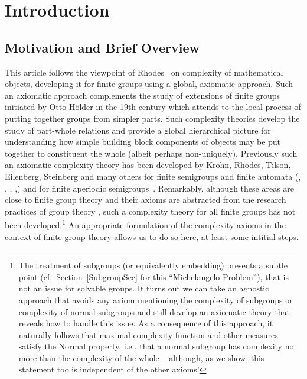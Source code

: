 \documentclass[a4paper,11pt]{amsart}
\theoremstyle{definition}
\newcommand{\1}{{\mathbf 1}}
\begin{document}
  
\newpage

\tableofcontents
\newpage
  

\section{Introduction}\label{sec_intro}

\subsection{Motivation and Brief Overview}
This article follows the viewpoint of Rhodes~\cite{wildbook} on complexity of mathematical objects, developing it for finite groups using a global, axiomatic approach.
Such an axiomatic approach complements the study of extensions of finite groups initiated by Otto H\"older in the 19th century which attends to the local process of putting together groups from simpler parts.
Such complexity theories develop the study of part-whole relations and provide a global hierarchical picture for understanding how simple building block components of
 objects may be put together to constituent the whole (albeit perhaps non-uniquely).  
Previously such an axiomatic complexity theory has been developed by Krohn, Rhodes, Tilson, Eilenberg, Steinberg and many others
for  finite semigroups and finite automata  (\cite{KrohnRhodes-PNAS}, \cite{EilenbergVolB}, \cite{TilsonInEilenbergB}, \cite{BioCpx},\cite[Ch.~4]{qtheory})  and for finite aperiodic semigroups~\cite{aperiodicCpx}. 
Remarkably, although these areas are close to finite group theory and their axioms are abstracted from the research practices of group theory \cite[Ch.~2-3]{wildbook}, such a complexity theory for all finite groups has not been developed.\footnote{The treatment of subgroups (or equivalently embedding) presents a subtle point (cf.~Section~\ref{SubgroupSec} for this ``Michelangelo Problem''), that is not an issue for solvable groups. It turns out we can take an agnostic approach that avoids any axiom mentioning the complexity of subgroups or complexity of normal subgroups and still develop an axiomatic theory that reveals how to handle this issue.  As a consequence of this approach, it naturally follows that maximal complexity function and other measures satisfy the Normal property, i.e., that a normal subgroup has complexity no more than the complexity of the whole -- although, as we show, this statement too is independent of the other axioms!} 
An appropriate formulation of the complexity axioms in the context of finite group theory allows us to do so here, at least some intitial steps.  
\end{document}
